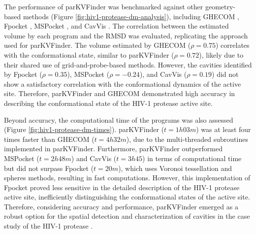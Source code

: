 \documentclass[Ingles]{phdthesis}
\begin{document}
The performance of parKVFinder \cite{guerra2020} was benchmarked against other geometry-based methods (Figure \ref{fig:hiv1-protease-dm-analysis}), including GHECOM \cite{ghecom}, Fpocket \cite{fpocket}, MSPocket \cite{mspocket}, and CavVis \cite{cavvis}. The correlation between the estimated volume by each program and the \acs{RMSD} was evaluated, replicating the approach used for parKVFinder. The volume estimated by GHECOM ($\rho=0.75$) correlates with the conformational state, similar to parKVFinder ($\rho=0.72$), likely due to their shared use of grid-and-probe-based methods. However, the cavities identified by Fpocket ($\rho=0.35$), MSPocket ($\rho=-0.24$), and CavVis ($\rho=0.19$) did not show a satisfactory correlation with the conformational dynamics of the active site. Therefore, parKVFinder and GHECOM demonstrated high accuracy in describing the conformational state of the HIV-1 protease active site.

Beyond accuracy, the computational time of the programs was also assessed (Figure \ref{fig:hiv1-protease-dm-times}). parKVFinder ($t=1h03m$) was at least four times faster than GHECOM ($t=4h32m$), due to the multi-threaded subroutines implemented in parKVFinder. Furthermore, parKVFinder outperformed MSPocket ($t=2h48m$) and CavVis ($t=3h45$) in terms of computational time but did not surpass Fpocket ($t=20m$), which uses Voronoi tessellation and \textalpha\space spheres methods, resulting in fast computations. However, this implementation of Fpocket proved less sensitive in the detailed description of the HIV-1 protease active site, inefficiently distinguishing the conformational states of the active site. Therefore, considering accuracy and performance, parKVFinder emerged as a robust option for the spatial detection and characterization of cavities in the case study of the HIV-1 protease \cite{guerra2020}.
\end{document}
